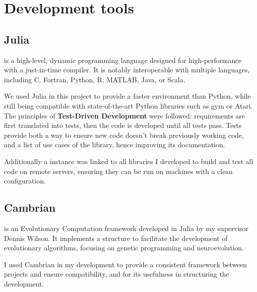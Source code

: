 \section{Development tools}
\subsection{Julia}
    
 is a high-level, dynamic programming language designed for high-performance with a just-in-time compiler. It is notably interoperable with multiple languages, including C, Fortran, Python, R, MATLAB, Java, or Scala. \cite{julia-lang}

We used Julia in this project to provide a faster environment than Python, while still being compatible with state-of-the-art Python libraries such as gym or Atari.
\\

The principles of \textbf{Test-Driven Development} were followed: requirements are first translated into tests, then the code is developed until all tests pass. Tests provide both a way to ensure new code doesn't break previously working code, and a list of use cases of the library, hence improving its documentation.

Additionally a  instance was linked to all libraries I developed to build and test all code on remote servers, ensuring they can be run on machines with a clean configuration. 

\subsection{Cambrian}

 is an Evolutionary Computation framework developed in Julia by my supervisor Dennis Wilson. It implements a structure to facilitate the development of evolutionary algorithms, focusing on genetic programming and neuroevolution. 

I used Cambrian in my development to provide a consistent framework between projects and ensure compatibility, and for its usefulness in structuring the development.

